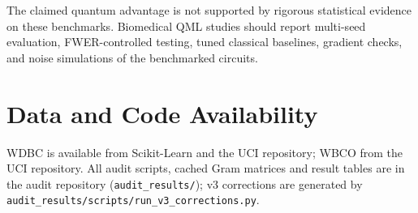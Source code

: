 \documentclass[journal,twocolumn]{IEEEtran}
\begin{document}
The claimed quantum advantage is not supported by rigorous statistical evidence on these benchmarks. Biomedical QML studies should report multi-seed evaluation, FWER-controlled testing, tuned classical baselines, gradient checks, and noise simulations of the benchmarked circuits.

\section*{Data and Code Availability}
WDBC is available from Scikit-Learn and the UCI repository; WBCO from the UCI repository. All audit scripts, cached Gram matrices and result tables are in the audit repository (\texttt{audit\_results/}); v3 corrections are generated by \texttt{audit\_results/scripts/run\_v3\_corrections.py}.

\end{document}

